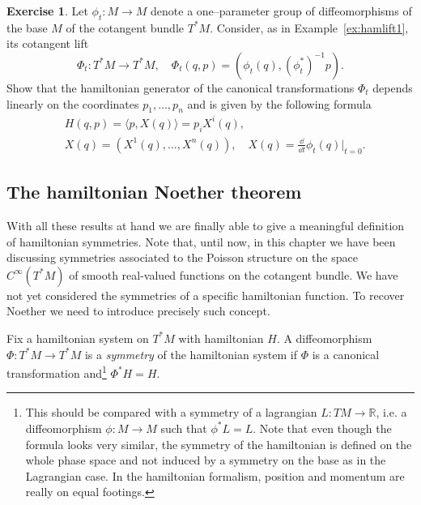 \documentclass[english,fontsize=11pt,paper=b5]{scrbook}
\theoremstyle{definition}
\newtheorem{exercise}{Exercise}[chapter]
\begin{document}
    \begin{exercise}
      Let $\phi_t:M\to M$ denote a one--parameter group of diffeomorphisms of the base  $M$ of the cotangent bundle $T^*M$.
      Consider, as in Example~\ref{ex:hamlift1}, its cotangent lift
      \begin{equation}
        \Phi_t:T^*M\to T^*M, \quad \Phi_t(q,p) = \left(\phi_t(q), \left(\phi_t^*\right)^{-1}p\right).
      \end{equation}
      Show that the hamiltonian generator of the canonical transformations $\Phi_t$ depends linearly on the coordinates $p_1, \ldots, p_n$ and is given by the following formula
      \begin{align}
     & H(q,p) = \langle p, X(q) \rangle = p_i X^i(q), \label{eq:linhamp}                   \\
     & X(q) = (X^1(q), \ldots, X^n(q)), \quad X(q) = \frac{\dd}{\dd t} \phi_t(q)\Big|_{t=0}.
      \end{align}
    \end{exercise}

    \subsection{The hamiltonian Noether theorem}

    With all these results at hand we are finally able to give a meaningful definition of hamiltonian symmetries.
    Note that, until now, in this chapter we have been discussing symmetries associated to the Poisson structure on the space $C^\infty(T^*M)$ of smooth real-valued functions on the cotangent bundle.
    We have not yet considered the symmetries of a specific hamiltonian function.
    To recover Noether we need to introduce precisely such concept.

    \begin{tcolorbox}
      Fix a hamiltonian system on $T^*M$ with hamiltonian $H$. A diffeomorphism $\Phi:T^*M\to T^* M$ is a \emph{symmetry} of the hamiltonian system if $\Phi$ is a canonical transformation and\footnote{This should be compared with a symmetry of a lagrangian $L:TM \to\mathbb{R}$, i.e. a diffeomorphism $\phi: M \to M$ such that $\phi^* L = L$. Note that even though the formula looks very similar, the symmetry of the hamiltonian is defined on the whole phase space and not induced by a symmetry on the base as in the Lagrangian case. In the hamiltonian formalism, position and momentum are really on equal footings.} $\Phi^* H = H$.
    \end{tcolorbox}
\end{document}
